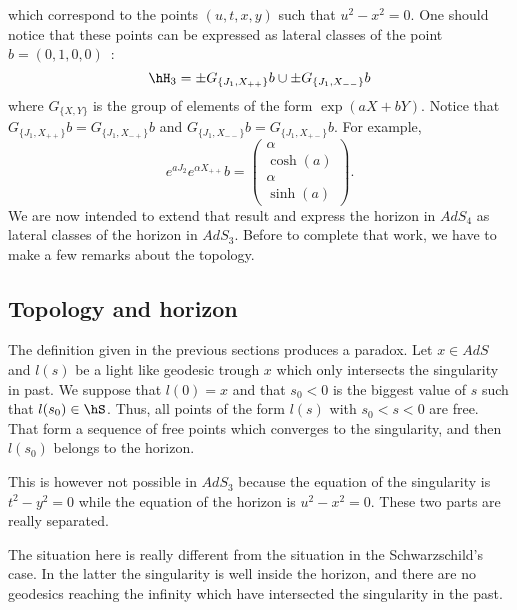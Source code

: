 which correspond to the points $(u,t,x,y)$ such that $u^2-x^2=0$. One should notice that these points can be expressed as lateral classes of the point $b=(0,1,0,0)$~:
\begin{equation}
	\hH_3=\pm G_{\{ J_1,X_{++} \}}b\cup\pm G_{\{ J_1,X_{--} \}}b
\end{equation}
where $G_{\{ X,Y \}}$ is the group of elements of the form $\exp(aX+bY)$. Notice that $G_{\{ J_1,X_{++} \}}b=G_{\{ J_1,X_{-+} \}}b$ and $G_{\{ J_1,X_{--} \}}b=G_{\{ J_1,X_{+-} \}}b$. For example,
\begin{equation}
	e^{aJ_2} e^{\alpha X_{++}}b=\begin{pmatrix}
		\alpha	\\ 
		\cosh(a)	\\ 
		\alpha	\\ 
		\sinh(a)	
	\end{pmatrix}.
\end{equation}
We are now intended to extend that result and express the horizon in $AdS_4$ as lateral classes of the horizon in $AdS_3$. Before to complete that work, we have to make a few remarks about the topology.

\subsection{Topology and horizon}
\label{subSecTopoHor}

The definition given in the previous sections produces a paradox. Let $x\in AdS$ and $l(s)$ be a light like geodesic trough $x$ which only intersects the singularity in past. We suppose that $l(0)=x$ and that $s_0<0$ is the biggest value of $s$ such that $l(s_0)\in \hS$. Thus, all points of the form $l(s)$ with $s_0<s<0$ are free. That form a sequence of free points which converges to the singularity, and then $l(s_0)$ belongs to the horizon.

This is however not possible in $AdS_3$ because the equation of the singularity is $t^2-y^2=0$ while the equation of the horizon is $u^2-x^2=0$. These two parts are really separated. 

The situation here is really different from the situation in the Schwarzschild's case. In the latter the singularity is well inside the horizon, and there are no geodesics reaching the infinity which have intersected the singularity in the past.

